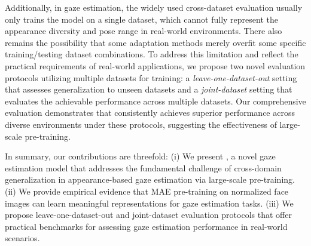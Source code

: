 Additionally, in gaze estimation, the widely used cross-dataset evaluation usually only trains the model on a single dataset, which cannot fully represent the appearance diversity and pose range in real-world environments.
There also remains the possibility that some adaptation methods merely overfit some specific training/testing dataset combinations.
To address this limitation and reflect the practical requirements of real-world applications, we propose two novel evaluation protocols utilizing multiple datasets for training: a \textit{leave-one-dataset-out} setting that assesses generalization to unseen datasets and a \textit{joint-dataset} setting that evaluates the achievable performance across multiple datasets.
Our comprehensive evaluation demonstrates that \methodname consistently achieves superior performance across diverse environments under these protocols, suggesting the effectiveness of large-scale pre-training. 




In summary, our contributions are threefold: 
(i) We present \methodname, a novel gaze estimation model that addresses the fundamental challenge of cross-domain generalization in appearance-based gaze estimation via large-scale pre-training.
(ii) We provide empirical evidence that MAE pre-training on normalized face images can learn meaningful representations for gaze estimation tasks.
(iii) We propose leave-one-dataset-out and joint-dataset evaluation protocols that offer practical benchmarks for assessing gaze estimation performance in real-world scenarios.


